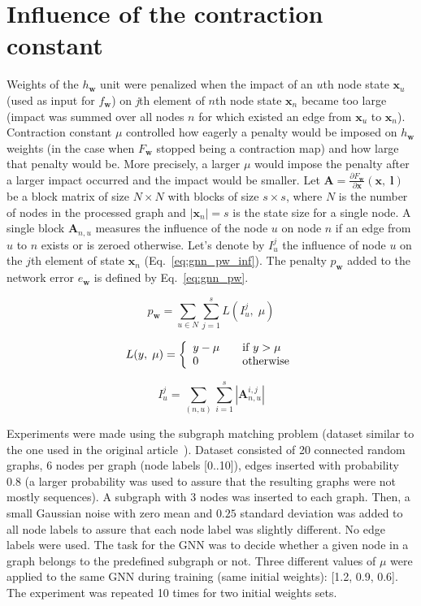 \documentclass[]{spie}  %
\newcommand{\bm}[1]{\boldsymbol{#1}}
\begin{document}
\section{Influence of the contraction constant}
Weights of the $h_{\bm{w}}$ unit were penalized when the impact of an $u$th node state $\bm{x}_u$ (used as input for $f_{\bm{w}}$) on \emph{j}th element of $n$th node state $\bm{x}_n$ became too large (impact was summed over all nodes $n$ for which existed an edge from $\bm{x}_u$ to $\bm{x}_n$). Contraction constant $\mu$ controlled how eagerly a penalty would be imposed on $h_{\bm{w}}$ weights (in the case when $F_{\bm{w}}$ stopped being a contraction map) and how large that penalty would be. More precisely, a larger $\mu$ would impose the penalty after a larger impact occurred and the impact would be smaller. Let $\bm{A} = \frac{\partial F_{\bm{w}}}{\partial \bm{x}}(\bm{x}, \; \bm{l})$ be a block matrix of size $N \times N$ with blocks of size $s \times s$, where $N$ is the number of nodes in the processed graph and $|\bm{x}_n| = s$ is the state size for a single node. A single block $\bm{A}_{n,u}$ measures the influence of the node $u$ on node $n$ if an edge from $u$ to $n$ exists or is zeroed otherwise. Let's denote by $I_u^j$ the influence of node $u$ on the $j$th element of state $\bm{x}_n$ (Eq.~\ref{eq:gnn_pw_inf}). The penalty $p_{\bm{w}}$ added to the network error $e_{\bm{w}}$ is defined by Eq.~\ref{eq:gnn_pw}.

\begin{equation}
p_{\bm{w}} = \sum_{u \in N} \sum_{j = 1}^{s} L(I_u^j, \; \mu)
\label{eq:gnn_pw}
\end{equation}

\begin{equation}
L(y, \; \mu) = \left\{
\begin{array}{l l}
	y - \mu		& \quad \text{if $y > \mu$} \\
	0			& \quad \text{otherwise}
\end{array} \right.
\label{eq:gnn_pw_L}
\end{equation}

\begin{equation}
I_u^j =  \sum_{(n, u)} \sum_{i = 1}^{s} |\bm{A}_{n, u}^{i, j}|
\label{eq:gnn_pw_inf}
\end{equation}

Experiments were made using the subgraph matching problem (dataset similar to the one used in the original article~\cite{scarselli2009graph}). Dataset consisted of 20 connected random graphs, 6 nodes per graph (node labels [0..10]), edges inserted with probability 0.8 (a larger probability was used to assure that the resulting graphs were not mostly sequences). A subgraph with 3 nodes was inserted to each graph. Then, a small Gaussian noise with zero mean and $0.25$ standard deviation was added to all node labels to assure that each node label was slightly different. No edge labels were used. The task for the GNN was to decide whether a given node in a graph belongs to the predefined subgraph or not. Three different values of $\mu$ were applied to the same GNN during training (same initial weights): [1.2, 0.9, 0.6]. The experiment was repeated 10 times for two initial weights sets.
\end{document}
